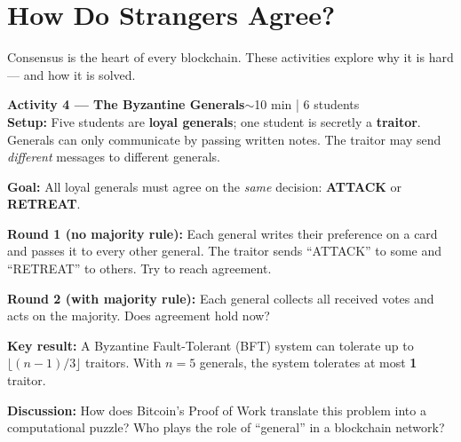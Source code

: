 \documentclass[11pt,a4paper]{article}
\newcommand{\activitybox}[3]{%
  \noindent\colorbox{mllavender4}{\parbox{\dimexpr\linewidth-2\fboxsep}{%
    \textbf{\color{mlpurple}#1}\hfill\textcolor{mlgray}{\small #2}\\[2pt]#3%
  }}\par\vspace{4pt}%
}
\begin{document}
\newpage


\section*{\color{mlpurple}How Do Strangers Agree?}

\vspace{-2pt}
\noindent\textcolor{mlgray}{\small Consensus is the heart of every blockchain. These activities explore why it is hard — and how it is solved.}
\vspace{4pt}

\activitybox{Activity 4 — The Byzantine Generals}{$\sim$10 min | 6 students}{%
\textbf{Setup:} Five students are \textcolor{mlgreen}{\textbf{loyal generals}}; one student is secretly a \textcolor{mlred}{\textbf{traitor}}.
Generals can only communicate by passing written notes.
The traitor may send \emph{different} messages to different generals.

\textbf{Goal:} All loyal generals must agree on the \emph{same} decision: \textbf{ATTACK} or \textbf{RETREAT}.

\vspace{3pt}
\textbf{Round 1 (no majority rule):} Each general writes their preference on a card and passes it to every other general. The traitor sends ``ATTACK'' to some and ``RETREAT'' to others. Try to reach agreement.

\vspace{2pt}
\textbf{Round 2 (with majority rule):} Each general collects all received votes and acts on the majority. Does agreement hold now?

\vspace{3pt}
\textbf{Key result:} A Byzantine Fault-Tolerant (BFT) system can tolerate up to $\lfloor(n-1)/3\rfloor$ traitors.
With $n=5$ generals, the system tolerates at most \textbf{1} traitor.

\vspace{3pt}
\textbf{Discussion:} How does Bitcoin's Proof of Work translate this problem into a computational puzzle? Who plays the role of ``general'' in a blockchain network?
}

\vspace{2pt}
\end{document}
